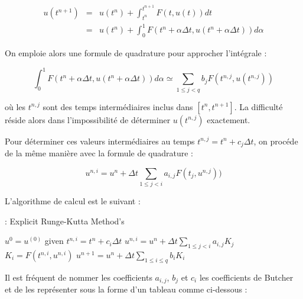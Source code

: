 \documentclass[10pt,a4paper]{amsart}
\def\gint{\displaystyle\int}
\begin{document}
$$
\begin{array}{rcl}
u(t^{n+1}) & = & u(t^n) + \gint_{t^n}^{t^{n+1}} F(t, u(t))dt\\
           & = & u(t^n) + \gint_{0}^{1} F(t^n + \alpha \Delta t, u(t^n + \alpha \Delta t)) d \alpha
\end{array}
$$

On emploie alors une formule de quadrature pour approcher l'intégrale :

\begin{equation}\label{RK_quadratureglobale}
\gint_{0}^{1} F(t^n + \alpha \Delta t, u(t^n + \alpha \Delta t)) d \alpha \simeq \sum_{1 \leq j < q} b_j F(t^{n,j}, u(t^{n,j}))
\end{equation}

où les $t^{n,j}$ sont des temps intermédiaires inclus dans $\left[ t^n, t^{n+1} \right]$. La difficulté réside alors dans l'impossibilité de déterminer $u(t^{n,j})$ exactement.

Pour déterminer ces valeurs intermédiaires au temps $t^{n,j} = t^n + c_j \Delta t$, on procéde de la même manière avec la formule de quadrature :

\begin{equation}\label{RK_quadratureglobale}
u^{n,i} = u^n + \Delta t \sum_{1 \leq j < i} a_{i,j} F(t_j, u^{n,j}))
\end{equation}

L'algorithme de calcul est le suivant :

 \begin{center}
\begin{minipage}[H]{12cm}
  \begin{algorithm}[H]
    \caption{: Explicit Runge-Kutta Method's}\label{RK}
    \begin{algorithmic}[1]
        \State $u^0 = u^{(0)}$ given
             \State  $t^{n,i} = t^n + c_i \Delta t$
             \State  $u^{n,i} = u^n + \Delta t \sum_{1 \leq j < i} a_{i,j} K_j$
             \State  $K_i = F(t^{n,i}, u^{n,i})$ 
             \EndFor
              \State $u^{n+1} = u^n + \Delta t \sum_{1 \leq i \leq q} b_i K_i$           
            \EndFor
    \end{algorithmic}
    \end{algorithm}
\end{minipage}
\end{center}

Il est fréquent de nommer les coefficients $a_{i,j}$, $b_j$ et $c_i$ les coefficients de Butcher et de les représenter sous la forme d'un tableau comme ci-dessous :
\end{document}

